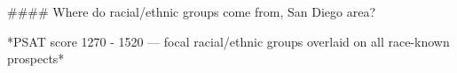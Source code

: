 #### Where do racial/ethnic groups come from, San Diego area?

*PSAT score 1270 - 1520 — focal racial/ethnic groups overlaid on all race-known prospects*

